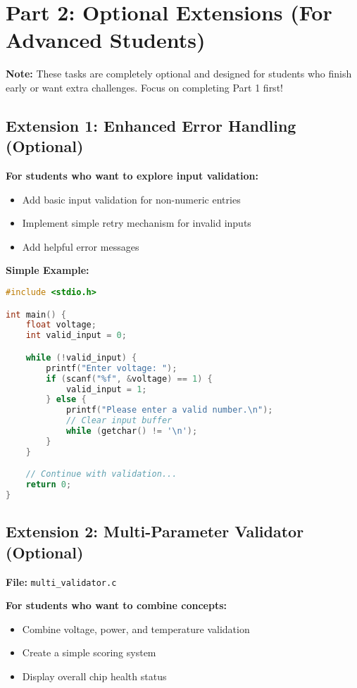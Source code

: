\documentclass[11pt,a4paper]{article}
\begin{document}
\section{Part 2: Optional Extensions (For Advanced Students)}

\textbf{Note:} These tasks are completely optional and designed for students who finish early or want extra challenges. Focus on completing Part 1 first!

\subsection{Extension 1: Enhanced Error Handling (Optional)}

\textbf{For students who want to explore input validation:}
\begin{itemize}
    \item Add basic input validation for non-numeric entries
    \item Implement simple retry mechanism for invalid inputs
    \item Add helpful error messages
\end{itemize}

\textbf{Simple Example:}
\begin{lstlisting}[language=C]
#include <stdio.h>

int main() {
    float voltage;
    int valid_input = 0;

    while (!valid_input) {
        printf("Enter voltage: ");
        if (scanf("%f", &voltage) == 1) {
            valid_input = 1;
        } else {
            printf("Please enter a valid number.\n");
            // Clear input buffer
            while (getchar() != '\n');
        }
    }

    // Continue with validation...
    return 0;
}
\end{lstlisting}

\subsection{Extension 2: Multi-Parameter Validator (Optional)}

\textbf{File:} \texttt{multi\_validator.c}

\textbf{For students who want to combine concepts:}
\begin{itemize}
    \item Combine voltage, power, and temperature validation
    \item Create a simple scoring system
    \item Display overall chip health status
\end{itemize}
\end{document}
